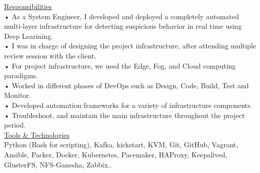 \documentclass{cv}
\begin{document}
    {
      \underline {Responsibilities}\vspace{.2cm}\\
      • As a System Engineer, I developed and deployed a completely automated multi-layer infrastructure 
      for detecting suspicious behavior in real time using Deep Learining.\\
      • I was in charge of designing the project infrastructure, after attending multiple review session 
      with the client.\\
      • For project infrastructure, we used the Edge, Fog, and Cloud computing paradigms.\\
      • Worked in different phases of DevOps such as Design, Code, Build, Test and Monitor.\\
      • Developed automation frameworks for a variety of infrastructure components.\\
      • Troubleshoot, and maintain the main infrastructure throughout the project period.\\
      \underline {Tools \& Technologies}\\
      Python (Bash for scripting), Kafka, kickstart, KVM, Git, GitHub, Vagrant, Ansible, Packer, Docker, Kubernetes, Pacemaker, HAProxy, Keepalived, GlusterFS, NFS-Ganesha, Zabbix..\\
    }


\end{document}
